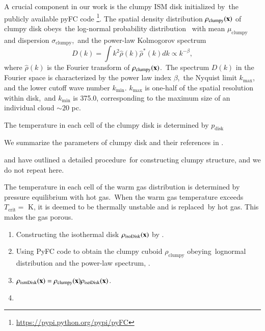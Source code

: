 \documentclass[twocolumn]{aastex631}
\begin{document}
  A crucial component in our work is the clumpy ISM disk initialized by\
  the publicly available pyFC code
  \footnote{\url{https://pypi.python.org/pypi/pyFC}}.
  The spatial density distribution $\rho_{\text{clumpy}}(\bold{x})$ of clumpy disk obeys\
  the log-normal probability distribution\
  with mean $\mu_{\text{clumpy}}$ and dispersion $\sigma_{\text{clumpy}}$,\
  and the power-law Kolmogorov spectrum
  \begin{equation}
    D(k)=\int k^{2} \hat{\rho}(k)\hat{\rho}^{*}(k)dk \propto k^{-\beta},
    \label{Kolmogorov-spectrum}
  \end{equation}
  where $\hat{\rho}(k)$ is the Fourier transform of $\rho_{\text{clumpy}}(\bold{x})$.\
  The spectrum $D(k)$ in the Fourier space is characterized by the power law index $\beta$,\
  the Nyquist limit $k_{\text{max}}$, and the lower cutoff wave number $k_{\text{min}}$.
  $k_{\text{max}}$ is one-half of the spatial resolution within disk,\
  and $k_{\text{min}}$ is 375.0, corresponding to the maximum size of an individual cloud $\sim 20$ pc.\


  The temperature in each cell of the clumpy disk is determined by $p_{\text{disk}}$


  We summarize the parameters of clumpy disk and their references in .



  \citet{LA2002} and \citet{Wagner2012} have outlined a detailed procedure\
  for constructing clumpy structure, and we do not repeat here.


  The temperature in each cell of the warm gas distribution is determined by pressure equilibrium with hot gas.\
  When the warm gas temperature exceeds $T_{\text{crit}}=$ K, it is deemed to be thermally unstable and is replaced\
  by hot gas. This makes the gas porous.


  \begin{enumerate}
     \item Constructing the isothermal disk $\rho_{\text{isoDisk}}(\bold{x})$ by .
     \item Using PyFC code to obtain the clumpy cuboid $\rho_{\text{clumpy}}$ obeying\
           lognormal distribution and the power-law spectrum, .
     \item $\rho_{\text{ismDisk}}(\bf{x}) = \rho_{\text{clumpy}}(\bf{x}) \rho_{\text{isoDisk}}(\bf{x})$.
     \item
  \end{enumerate}
\end{document}
